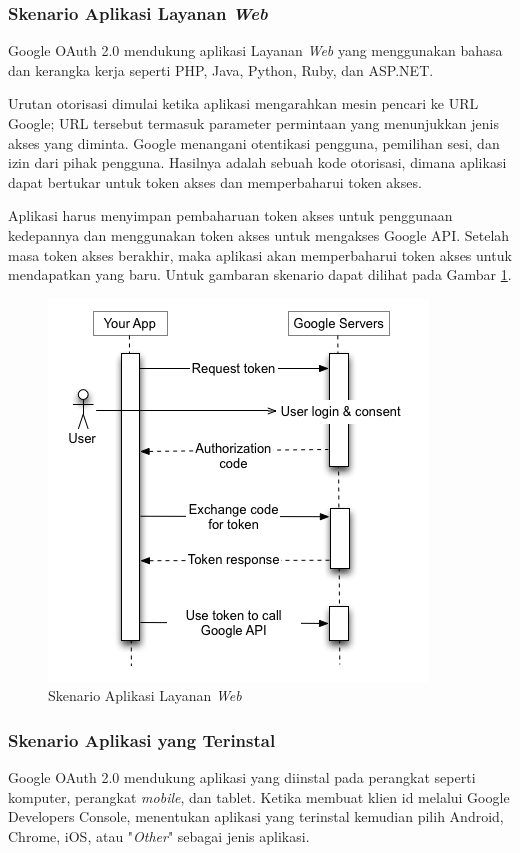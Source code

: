 \subsubsection{Skenario Aplikasi Layanan {\it Web}}
Google OAuth 2.0 mendukung aplikasi Layanan {\it Web} yang menggunakan bahasa
dan kerangka kerja seperti PHP, Java, Python, Ruby, dan ASP.NET.

Urutan otorisasi dimulai ketika aplikasi mengarahkan mesin pencari ke URL
Google; URL tersebut termasuk parameter permintaan yang menunjukkan jenis akses
yang diminta. Google menangani otentikasi pengguna, pemilihan sesi, dan izin
dari pihak pengguna. Hasilnya adalah sebuah kode otorisasi, dimana aplikasi
dapat bertukar untuk token akses dan memperbaharui token akses.

Aplikasi harus menyimpan pembaharuan token akses untuk penggunaan kedepannya dan
menggunakan token akses untuk mengakses Google API. Setelah masa token akses
berakhir, maka aplikasi akan memperbaharui token akses untuk mendapatkan yang
baru. Untuk gambaran skenario dapat dilihat pada Gambar
\ref{fig:skenarioaplikasiwebserver}.

\begin{figure}[H]
\centering
\includegraphics[scale=0.8]{Gambar/skenario1.png}
\caption[Skenario Aplikasi Layanan {\it Web}]{Skenario Aplikasi Layanan {\it
Web}}
\label{fig:skenarioaplikasiwebserver}
\end{figure}

\subsubsection{Skenario Aplikasi yang Terinstal}
Google OAuth 2.0 mendukung aplikasi yang diinstal pada perangkat seperti
komputer, perangkat {\it mobile}, dan tablet. Ketika membuat klien id melalui
Google Developers Console, menentukan aplikasi yang terinstal kemudian pilih Android,
Chrome, iOS, atau "{\it Other}" sebagai jenis aplikasi.

